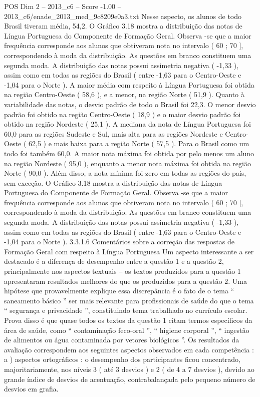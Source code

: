 \begin{textsample}{POS Dim 2 – 2013\_c6 – Score -1.00 – 2013\_c6/enade\_2013\_med\_9c8209e0a3.txt}
Nesse aspecto, os alunos de todo Brasil tiveram média, 54,2.
O Gráfico 3.18 mostra a distribuição das notas de Língua Portuguesa do Componente de Formação Geral.
Observa -se que a maior frequência corresponde aos alunos que obtiveram nota no intervalo ( 60 ; 70 ], correspondendo à moda da distribuição.
As questões em branco constituem uma segunda moda.
A distribuição das notas possui assimetria negativa ( -1,33 ), assim como em todas as regiões do Brasil ( entre -1,63 para o Centro-Oeste e -1,04 para o Norte ).
A maior média com respeito à Língua Portuguesa foi obtida na região Centro-Oeste ( 58,6 ), e a menor, na região Norte ( 51,9 ).
Quanto à variabilidade das notas, o desvio padrão de todo o Brasil foi 22,3.
O menor desvio padrão foi obtido na região Centro-Oeste ( 18,9 ) e o maior desvio padrão foi obtido na região Nordeste ( 25,1 ).
A mediana da nota de Língua Portuguesa foi 60,0 para as regiões Sudeste e Sul, mais alta para as regiões Nordeste e Centro-Oeste ( 62,5 ) e mais baixa para a região Norte ( 57,5 ).
Para o Brasil como um todo foi também 60,0.
A maior nota máxima foi obtida por pelo menos um aluno na região Nordeste ( 95,0 ), enquanto a menor nota máxima foi obtida na região Norte ( 90,0 ).
Além disso, a nota mínima foi zero em todas as regiões do país, sem exceção.
O Gráfico 3.18 mostra a distribuição das notas de Língua Portuguesa do Componente de Formação Geral.
Observa -se que a maior frequência corresponde aos alunos que obtiveram nota no intervalo ( 60 ; 70 ], correspondendo à moda da distribuição.
As questões em branco constituem uma segunda moda.
A distribuição das notas possui assimetria negativa ( -1,33 ), assim como em todas as regiões do Brasil ( entre -1,63 para o Centro-Oeste e -1,04 para o Norte ). 3.3.1.6 Comentários sobre a correção das respostas de Formação Geral com respeito à Língua Portuguesa Um aspecto interessante a ser destacado é a diferença de desempenho entre a questão 1 e a questão 2, principalmente nos aspectos textuais – os textos produzidos para a questão 1 apresentaram resultados melhores do que os produzidos para a questão 2.
Uma hipótese que provavelmente explique essa discrepância é o fato de o tema “ saneamento básico ” ser mais relevante para profissionais de saúde do que o tema “ segurança e privacidade ”, constituindo tema trabalhado no currículo escolar.
Prova disso é que quase todos os textos da questão 1 citam termos específicos da área de saúde, como “ contaminação feco-oral ”, “ higiene corporal ”, “ ingestão de alimentos ou água contaminada por vetores biológicos ”.
Os resultados da avaliação correspondem aos seguintes aspectos observados em cada competência : a ) aspectos ortográficos : o desempenho dos participantes ficou concentrado, majoritariamente, nos níveis 3 ( até 3 desvios ) e 2 ( de 4 a 7 desvios ), devido ao grande índice de desvios de acentuação, contrabalançada pelo pequeno número de desvios em grafia.

\end{textsample}
